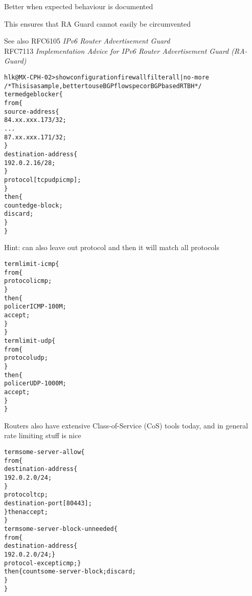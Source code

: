 \documentclass[Screen16to9,17pt]{foils}
\begin{document}
\begin{list2}
\item Better when expected behaviour is documented
\item This ensures that RA Guard cannot easily be circumvented
\item See also RFC6105 \emph{IPv6 Router Advertisement Guard} \\
RFC7113 \emph{Implementation Advice for IPv6 Router Advertisement Guard (RA-Guard)}
\end{list2}





\begin{alltt}\footnotesize
hlk@MX-CPH-02> show configuration firewall filter all | no-more
/* This is a sample, better to use BGP flowspec or BGP based RTBH */
term edgeblocker \{
    from \{
        source-address \{
            84.xx.xxx.173/32;
...
            87.xx.xxx.171/32;
        \}
        destination-address \{
            192.0.2.16/28;
        \}
        protocol [ tcp udp icmp ];
    \}
    then \{
        count edge-block;
        discard;
    \}
\}
\end{alltt}
Hint: can also leave out protocol and then it will match all protocols


\begin{alltt}\footnotesize
term limit-icmp \{
    from \{
        protocol icmp;
    \}
    then \{
        policer ICMP-100M;
        accept;
    \}
\}
term limit-udp \{
    from \{
        protocol udp;
    \}
    then \{
        policer UDP-1000M;
        accept;
    \}
\}
\end{alltt}

Routers also have extensive Class-of-Service (CoS) tools today, and in general rate limiting stuff is nice


\begin{alltt}\footnotesize
term some-server-allow \{
    from \{
        destination-address \{
            192.0.2.0/24;
        \}
        protocol tcp;
        destination-port [ 80 443 ];
    \} then accept;
\}
term some-server-block-unneeded \{
    from \{
        destination-address \{
            192.0.2.0/24; \}
        protocol-except icmp;  \}
    then \{ count some-server-block; discard;
    \}
\}
\end{alltt}
\end{document}
